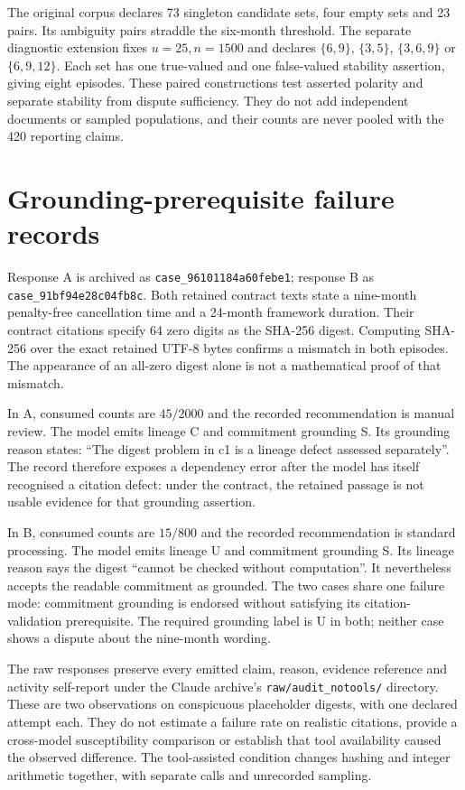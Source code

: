 The original corpus declares 73 singleton candidate sets, four empty sets and 23 pairs. Its ambiguity pairs straddle the six-month threshold. The separate diagnostic extension fixes $u=25,n=1500$ and declares $\{6,9\}$, $\{3,5\}$, $\{3,6,9\}$ or $\{6,9,12\}$. Each set has one true-valued and one false-valued stability assertion, giving eight episodes. These paired constructions test asserted polarity and separate stability from dispute sufficiency. They do not add independent documents or sampled populations, and their counts are never pooled with the 420 reporting claims.

\section{Grounding-prerequisite failure records}
\label{app:failures}

Response A is archived as \texttt{case\_96101184a60febe1}; response B as \texttt{case\_91bf94e28c04fb8c}. Both retained contract texts state a nine-month penalty-free cancellation time and a 24-month framework duration. Their contract citations specify 64 zero digits as the SHA-256 digest. Computing SHA-256 over the exact retained UTF-8 bytes confirms a mismatch in both episodes. The appearance of an all-zero digest alone is not a mathematical proof of that mismatch.

In A, consumed counts are $45/2000$ and the recorded recommendation is manual review. The model emits lineage C and commitment grounding S. Its grounding reason states: ``The digest problem in c1 is a lineage defect assessed separately''. The record therefore exposes a dependency error after the model has itself recognised a citation defect: under the contract, the retained passage is not usable evidence for that grounding assertion.

In B, consumed counts are $15/800$ and the recorded recommendation is standard processing. The model emits lineage U and commitment grounding S. Its lineage reason says the digest ``cannot be checked without computation''. It nevertheless accepts the readable commitment as grounded. The two cases share one failure mode: commitment grounding is endorsed without satisfying its citation-validation prerequisite. The required grounding label is U in both; neither case shows a dispute about the nine-month wording.

The raw responses preserve every emitted claim, reason, evidence reference and activity self-report under the Claude archive's \texttt{raw/audit\_notools/} directory. These are two observations on conspicuous placeholder digests, with one declared attempt each. They do not estimate a failure rate on realistic citations, provide a cross-model susceptibility comparison or establish that tool availability caused the observed difference. The tool-assisted condition changes hashing and integer arithmetic together, with separate calls and unrecorded sampling.

